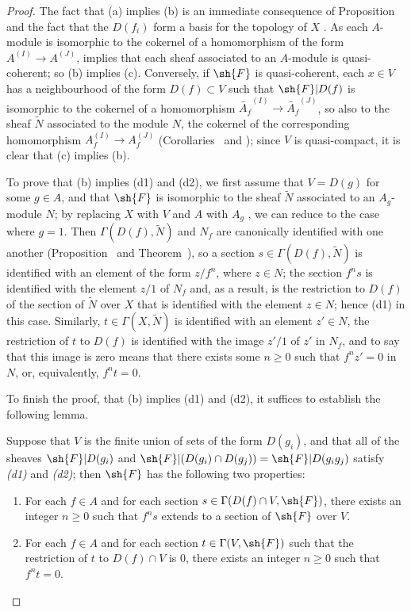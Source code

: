 \begin{proof}
The fact that (a) implies (b) is an immediate consequence of Proposition~ and the fact that the $D(f_i)$ form a basis for the topology of $X$ .
As each $A$-module is isomorphic to the cokernel of a homomorphism of the form $A^{(I)}\to A^{(J)}$,  implies that each sheaf associated to an $A$-module is quasi-coherent;
so (b) implies (c).
Conversely, if $\sh{F}$ is quasi-coherent, each $x\in V$ has a neighbourhood of the form $D(f)\subset V$ such that $\sh{F}|D(f)$ is isomorphic to the cokernel of a homomorphism $\widetilde{A_f}^{(I)}\to\widetilde{A_f}^{(J)}$, so also to the sheaf $\widetilde{N}$ associated to the module $N$, the cokernel of the corresponding homomorphism
$A_f^{(I)}\to A_f^{(J)}$ (Corollaries~ and );
since $V$ is quasi-compact, it is clear that (c) implies (b).

To prove that (b) implies (d1) and (d2), we first assume that $V=D(g)$ for some $g\in A$, and that $\sh{F}$ is isomorphic to the sheaf $\widetilde{N}$ associated to an $A_g$-module $N$;
by replacing $X$ with $V$ and $A$ with $A_g$ , we can reduce to the case where $g=1$.
Then $\Gamma(D(f),\widetilde{N})$ and $N_f$ are canonically identified with one another (Proposition~ and Theorem~), so a section $s\in\Gamma(D(f),\widetilde{N})$ is identified with an element of the form $z/f^n$, where $z\in N$;
the section $f^n s$ is identified with the element $z/1$ of $N_f$ and, as a result, is the restriction to $D(f)$ of the section of $\widetilde{N}$ over $X$ that is identified with the element $z\in N$;
hence (d1) in this case.
Similarly, $t\in\Gamma(X,\widetilde{N})$ is identified with an element $z'\in N$, the restriction of $t$ to $D(f)$ is identified with the image $z'/1$ of $z'$ in $N_f$, and to say that this image is zero means that there exists some $n\geq 0$ such that $f^n z'=0$ in $N$, or, equivalently, $f^n t=0$.

To finish the proof, that (b) implies (d1) and (d2), it suffices to establish the following lemma.
\begin{lemma}[1.4.1.1]
\label{I.1.4.1.1}
Suppose that $V$ is the finite union of sets of the form $D(g_i)$, and that all of the sheaves $\sh{F}|D(g_i)$ and $\sh{F}|(D(g_i)\cap D(g_j))=\sh{F}|D(g_i g_j)$ satisfy \emph{(d1)} and \emph{(d2)};
then $\sh{F}$ has the following two properties:
\begin{enumerate}
  \item[{\rm(d'1)}] For each $f\in A$ and for each section $s\in\Gamma(D(f)\cap V,\sh{F})$, there exists an integer $n\geq 0$ such that $f^n s$ extends to a section of $\sh{F}$ over $V$.
  \item[{\rm(d'2)}] For each $f\in A$ and for each section $t\in\Gamma(V,\sh{F})$ such that the restriction of $t$ to $D(f)\cap V$ is $0$, there exists an integer $n\geq 0$ such that $f^n t=0$.
\end{enumerate}
\end{lemma}


\end{proof}
